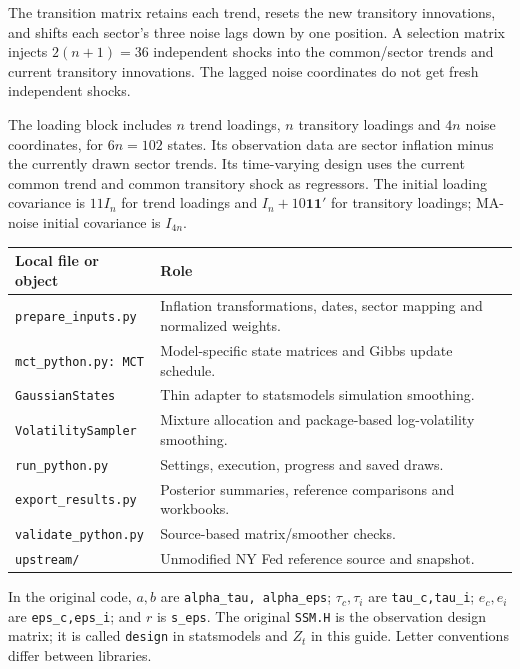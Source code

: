 \documentclass[11pt,a4paper]{article}
\begin{document}
The transition matrix retains each trend, resets the new transitory innovations, and shifts each sector's three noise lags down by one position. A selection matrix injects $2(n+1)=36$ independent shocks into the common/sector trends and current transitory innovations. The lagged noise coordinates do not get fresh independent shocks.

The loading block includes $n$ trend loadings, $n$ transitory loadings and $4n$ noise coordinates, for $6n=102$ states. Its observation data are sector inflation minus the currently drawn sector trends. Its time-varying design uses the current common trend and common transitory shock as regressors. The initial loading covariance is $11I_n$ for trend loadings and $I_n+10\mathbf1\mathbf1'$ for transitory loadings; MA-noise initial covariance is $I_{4n}$.

\begin{center}
\begin{tabular}{p{.40\linewidth}p{.49\linewidth}}
\toprule
Local file or object & Role\\\midrule
\texttt{prepare\_inputs.py} & Inflation transformations, dates, sector mapping and normalized weights.\\
\texttt{mct\_python.py: MCT} & Model-specific state matrices and Gibbs update schedule.\\
\texttt{GaussianStates} & Thin adapter to statsmodels simulation smoothing.\\
\texttt{VolatilitySampler} & Mixture allocation and package-based log-volatility smoothing.\\
\texttt{run\_python.py} & Settings, execution, progress and saved draws.\\
\texttt{export\_results.py} & Posterior summaries, reference comparisons and workbooks.\\
\texttt{validate\_python.py} & Source-based matrix/smoother checks.\\
\texttt{upstream/} & Unmodified NY Fed reference source and snapshot.\\\bottomrule
\end{tabular}
\end{center}
In the original code, $a,b$ are \texttt{alpha\_tau, alpha\_eps}; $\tau_c,\tau_i$ are \texttt{tau\_c,tau\_i}; $e_c,e_i$ are \texttt{eps\_c,eps\_i}; and $r$ is \texttt{s\_eps}. The original \texttt{SSM.H} is the observation design matrix; it is called \texttt{design} in statsmodels and $Z_t$ in this guide. Letter conventions differ between libraries.
\end{document}
